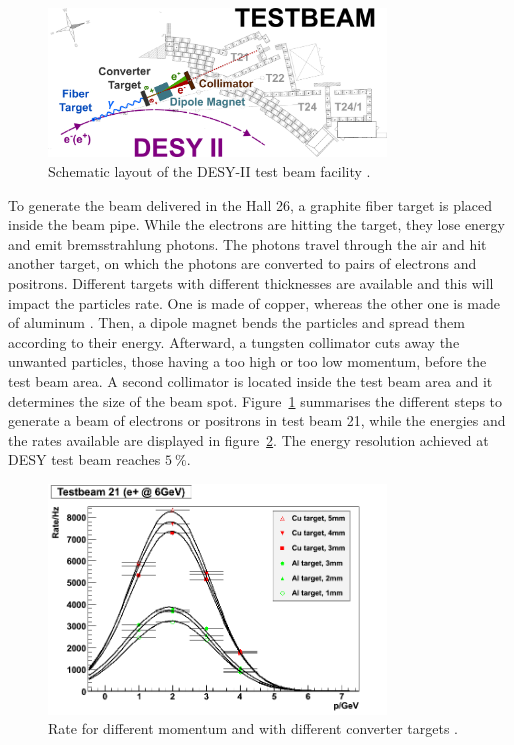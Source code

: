     \begin{figure}[!h]
      \centering
      \includegraphics[width = 0.8\textwidth]{Pictures/X0/desy_tb-sketch.png}
      \caption{Schematic layout of the DESY-II test beam facility \cite{DESYII}.}
      \label{fig:desyTb-sketch}
    \end{figure}

    To generate the beam delivered in the Hall 26, a graphite fiber target is placed inside the beam pipe.
    While the electrons are hitting the target, they lose energy and emit bremsstrahlung photons.
    The photons travel through the air and hit another target, on which the photons are converted to pairs of electrons and positrons.
    Different targets with different thicknesses are available and this will impact the particles rate.
    One is made of copper, whereas the other one is made of aluminum \cite{ConversionTargets}.
    Then, a dipole magnet bends the particles and spread them according to their energy.
    Afterward, a tungsten collimator cuts away the unwanted particles, those having a too high or too low momentum, before the test beam area.
    A second collimator is located inside the test beam area and it determines the size of the beam spot.
    Figure~\ref{fig:desyTb-sketch} summarises the different steps to generate a beam of electrons or positrons in test beam 21, while the energies and the rates available are displayed in figure~\ref{fig:rateTB21}.
    The energy resolution achieved at DESY test beam reaches $5~\%$.

    \begin{figure}[!h]
      \centering
      \includegraphics[width = 0.8\textwidth]{Pictures/X0/rate_vs_p_t21.png}
      \caption{Rate for different momentum and with different converter targets \cite{DESYII}.}
      \label{fig:rateTB21}
    \end{figure}

